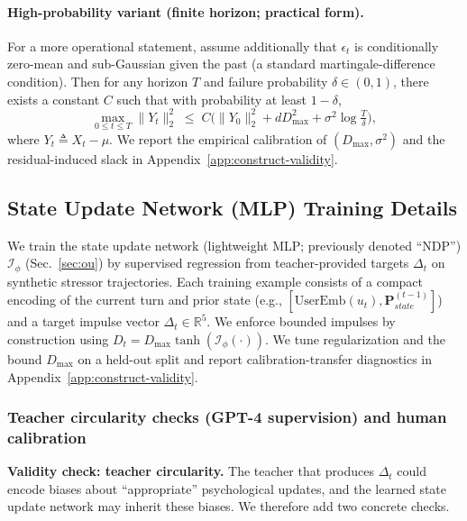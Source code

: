 \documentclass[11pt]{article}
\begin{document}
\paragraph{High-probability variant (finite horizon; practical form).}
For a more operational statement, assume additionally that $\epsilon_t$ is conditionally zero-mean and sub-Gaussian given the past (a standard martingale-difference condition).
Then for any horizon $T$ and failure probability $\delta\in(0,1)$, there exists a constant $C$ such that with probability at least $1-\delta$,
\begin{equation}
\max_{0\le t\le T}\|Y_t\|_2^2 \;\le\; C\Big(\|Y_0\|_2^2 + dD_{\max}^2 + \sigma^2\log\tfrac{T}{\delta}\Big),
\end{equation}
where $Y_t\triangleq X_t-\mu$.
We report the empirical calibration of $(D_{\max},\sigma^2)$ and the residual-induced slack in Appendix~\ref{app:construct-validity}.



\subsection{State Update Network (MLP) Training Details}
\label{app:impact-table-training}
We train the state update network (lightweight MLP; previously denoted ``NDP'') $\mathcal{I}_\phi$ (Sec.~\ref{sec:ou}) by supervised regression from teacher-provided targets $\Delta_t$ on synthetic stressor trajectories.
Each training example consists of a compact encoding of the current turn and prior state (e.g., $[\text{UserEmb}(u_t),\mathbf{P}_{state}^{(t-1)}]$) and a target impulse vector $\Delta_t\in\mathbb{R}^5$.
We enforce bounded impulses by construction using $D_t=D_{\max}\tanh(\mathcal{I}_\phi(\cdot))$.
We tune regularization and the bound $D_{\max}$ on a held-out split and report calibration-transfer diagnostics in Appendix~\ref{app:construct-validity}.

\subsubsection{Teacher circularity checks (GPT-4 supervision) and human calibration}
\textbf{Validity check: teacher circularity.} The teacher that produces $\Delta_t$ could encode biases about ``appropriate'' psychological updates, and the learned state update network may inherit these biases.
We therefore add two concrete checks.
\end{document}
